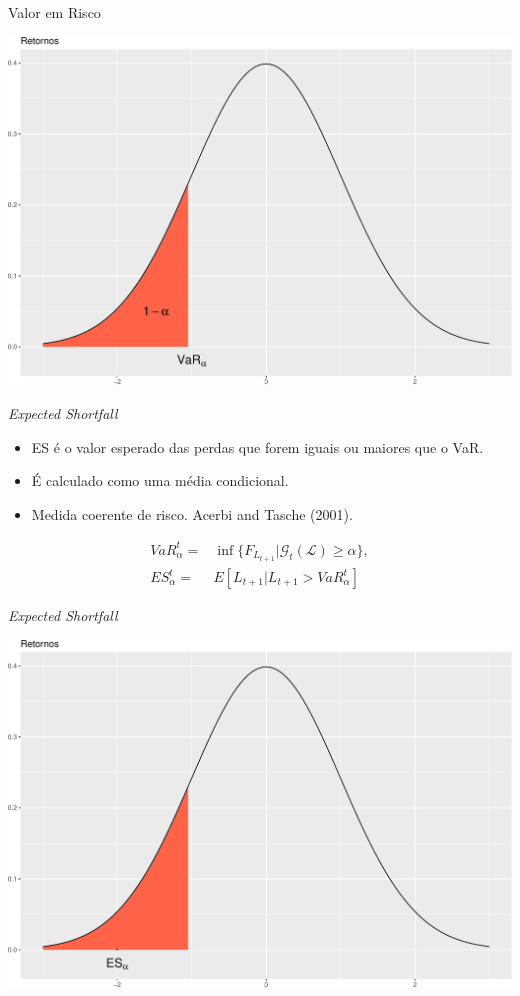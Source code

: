 \documentclass[ignorenonframetext,]{beamer}
\providecommand{\tightlist}{%
\setlength{\itemsep}{0pt}\setlength{\parskip}{0pt}}
\begin{document}
\begin{frame}{Valor em Risco}

\includegraphics{artigo-apresentacao_files/figure-beamer/var-1.pdf}

\end{frame}

\begin{frame}{\emph{Expected Shortfall}}

\begin{itemize}
\tightlist
\item
  ES é o valor esperado das perdas que forem iguais ou maiores que o
  VaR.
\item
  É calculado como uma média condicional.
\item
  Medida coerente de risco. Acerbi and Tasche (2001).
\end{itemize}

\begin{align*}
VaR_\alpha^t=&\inf\{F_{L_{t+1}} | \mathcal{G}_t(\mathcal{L}) \geq \alpha\}, \\
ES_\alpha^t=&E[L_{t+1} | L_{t+1} > VaR_\alpha^t]
\end{align*}

\end{frame}

\begin{frame}{\emph{Expected Shortfall}}

\includegraphics{artigo-apresentacao_files/figure-beamer/ES-1.pdf}

\end{frame}
\end{document}
